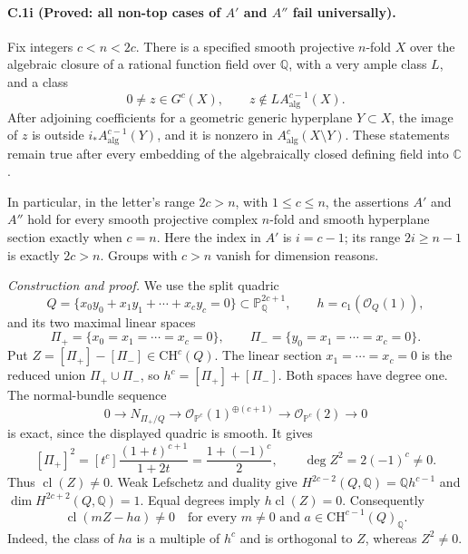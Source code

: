 \paragraph{C.1i (Proved: all non-top cases of $A'$ and $A''$ fail universally).}
Fix integers $c<n<2c$. There is a specified smooth projective
$n$-fold $X$ over the algebraic closure of a rational function
field over $\mathbb Q$, with a very ample class $L$, and a class
\[
 0\ne z\in G^c(X),\qquad
 z\notin L A^{c-1}_{\mathrm{alg}}(X).
\]
After adjoining coefficients for a geometric generic hyperplane
$Y\subset X$, the image of $z$ is outside
$i_*A^{c-1}_{\mathrm{alg}}(Y)$, and it is nonzero in
$A^c_{\mathrm{alg}}(X\setminus Y)$. These statements remain true
after every embedding of the algebraically closed defining field
into $\mathbb C$.

In particular, in the letter's range $2c>n$, with $1\le c\le n$,
the assertions $A'$ and $A''$ hold for every smooth projective
complex $n$-fold and smooth hyperplane section exactly when $c=n$.
Here the index in $A'$ is $i=c-1$; its range $2i\ge n-1$ is
exactly $2c>n$. Groups with $c>n$ vanish for dimension reasons.

\emph{Construction and proof.}
We use the split quadric
\[
 Q=\{x_0y_0+x_1y_1+\cdots+x_cy_c=0\}
            \subset\mathbb P^{2c+1}_{\mathbb Q},
       \qquad h=c_1(\mathcal O_Q(1)),
\]
and its two maximal linear spaces
\[
 \Pi_+=\{x_0=x_1=\cdots=x_c=0\},\qquad
 \Pi_-=\{y_0=x_1=\cdots=x_c=0\}.
\]
Put $Z=[\Pi_+]-[\Pi_-]\in\mathrm{CH}^c(Q)$.
The linear section $x_1=\cdots=x_c=0$ is the reduced union
$\Pi_+\cup\Pi_-$, so $h^c=[\Pi_+]+[\Pi_-]$.
Both spaces have degree one. The normal-bundle sequence
\[
 0\longrightarrow N_{\Pi_+/Q}\longrightarrow
       \mathcal O_{\mathbb P^c}(1)^{\oplus(c+1)}
       \longrightarrow\mathcal O_{\mathbb P^c}(2)
       \longrightarrow0
\]
is exact, since the displayed quadric is smooth. It gives
\[
 [\Pi_+]^2=[t^c]\frac{(1+t)^{c+1}}{1+2t}
       =\frac{1+(-1)^c}{2},\qquad
 \deg Z^2=2(-1)^c\ne0.
\]
Thus $\operatorname{cl}(Z)\ne0$. Weak Lefschetz and duality give
$H^{2c-2}(Q,\mathbb Q)=\mathbb Qh^{c-1}$ and
$\dim H^{2c+2}(Q,\mathbb Q)=1$. Equal degrees imply
$h\operatorname{cl}(Z)=0$. Consequently
\begin{equation}\label{eq:quadric-primitive-obstruction}
 \operatorname{cl}(mZ-ha)\ne0
 \quad\text{for every }m\ne0\text{ and }
                 a\in\mathrm{CH}^{c-1}(Q)_{\mathbb Q}.
\end{equation}
Indeed, the class of $ha$ is a multiple of $h^c$ and is
orthogonal to $Z$, whereas $Z^2\ne0$.

